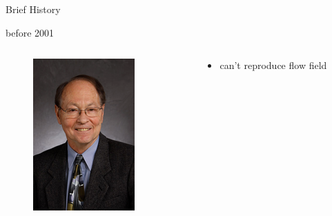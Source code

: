 \documentclass[hide notes,intlimits]{beamer}
\begin{document}
\begin{frame}{Brief History}

  \begin{block}{before 2001}  
    \begin{columns}[c]
      \begin{column}{.12\linewidth}
        \begin{figure}
          \includegraphics[width=\textwidth]{craig_lingle}
        \end{figure}
      \end{column}
      \begin{column}{.35\linewidth}
        \begin{itemize}
        \item can't reproduce flow field
        \end{itemize}
      \end{column}
    \end{columns}
  \end{block}


\end{frame}
\end{document}
